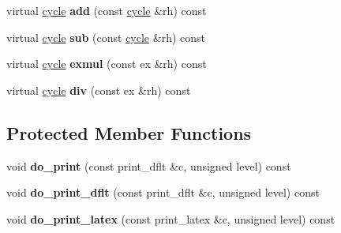\begin{DoxyCompactItemize}
virtual \mbox{\hyperlink{class_moeb_inv_1_1cycle}{cycle}} {\bfseries add} (const \mbox{\hyperlink{class_moeb_inv_1_1cycle}{cycle}} \&rh) const
\item 
\mbox{\label{class_moeb_inv_1_1cycle_a3a4f7d977cfb2ed4025ba9013e229e27}} 
virtual \mbox{\hyperlink{class_moeb_inv_1_1cycle}{cycle}} {\bfseries sub} (const \mbox{\hyperlink{class_moeb_inv_1_1cycle}{cycle}} \&rh) const
\item 
\mbox{\label{class_moeb_inv_1_1cycle_a8d187b8a78f64c038bc4722903501c74}} 
virtual \mbox{\hyperlink{class_moeb_inv_1_1cycle}{cycle}} {\bfseries exmul} (const ex \&rh) const
\item 
\mbox{\label{class_moeb_inv_1_1cycle_ac10ea6fcc2b7aaf185379a6dd77e97bf}} 
virtual \mbox{\hyperlink{class_moeb_inv_1_1cycle}{cycle}} {\bfseries div} (const ex \&rh) const
\end{DoxyCompactItemize}
\subsection*{Protected Member Functions}
\begin{DoxyCompactItemize}
\item 
\mbox{\label{class_moeb_inv_1_1cycle_a480825f714ac1daf43930434eaed8cd0}} 
void {\bfseries do\+\_\+print} (const print\+\_\+dflt \&c, unsigned level) const
\item 
\mbox{\label{class_moeb_inv_1_1cycle_accf05994662b590d40ada1615ce5cc2c}} 
void {\bfseries do\+\_\+print\+\_\+dflt} (const print\+\_\+dflt \&c, unsigned level) const
\item 
\mbox{\label{class_moeb_inv_1_1cycle_af155c4801d08afadeba7365df94ca934}} 
void {\bfseries do\+\_\+print\+\_\+latex} (const print\+\_\+latex \&c, unsigned level) const
\end{DoxyCompactItemize}
